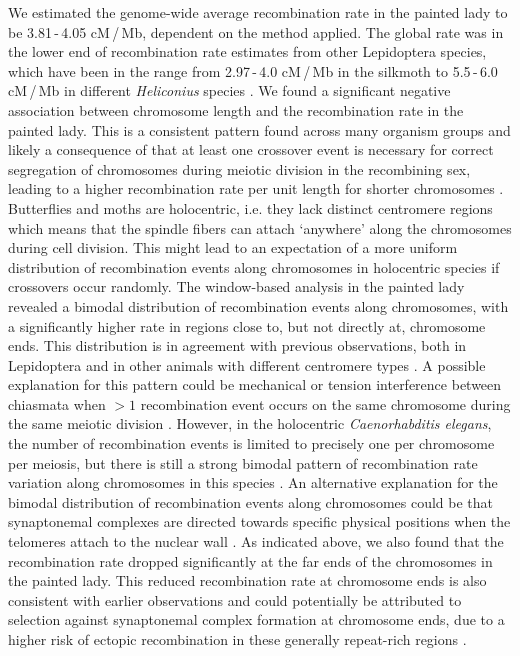 \documentclass[twocolumn]{bmcart}%
\begin{document}
We estimated the genome-wide average recombination rate in the painted lady to be 3.81\,-\,4.05 cM\,/\,Mb, dependent on the method applied. The global rate was in the lower end of recombination rate estimates from other Lepidoptera species, which have been in the range from 2.97\,-\,4.0 cM\,/\,Mb in the silkmoth \cite{yamamotoBACbasedIntegratedLinkage2008, yasukochiDenseGeneticMap1998} to 5.5\,-\,6.0 cM\,/\,Mb in different \textit{Heliconius} species \cite{jigginsGeneticLinkageMap2005, toblerFirstgenerationLinkageMap2005}. We found a significant negative association between chromosome length and the recombination rate in the painted lady. This is a consistent pattern found across many organism groups and likely a consequence of that at least one crossover event is necessary for correct segregation of chromosomes during meiotic division in the recombining sex, leading to a higher recombination rate per unit length for shorter chromosomes \cite{haenelMetaanalysisChromosomescaleCrossover2018, kawakamiWholegenomePatternsLinkage2017, martinRecombinationRateVariation2019}. Butterflies and moths are holocentric, i.e. they lack distinct centromere regions which means that the spindle fibers can attach ‘anywhere’ along the chromosomes during cell division. This might lead to an expectation of a more uniform distribution of recombination events along chromosomes in holocentric species if crossovers occur randomly. The window-based analysis in the painted lady revealed a bimodal distribution of  recombination events along chromosomes, with a significantly higher rate in regions close to, but not directly at, chromosome ends. This distribution is in agreement with previous observations, both in Lepidoptera and in other animals with different centromere types \cite{haenelMetaanalysisChromosomescaleCrossover2018, martinRecombinationRateVariation2019}. A possible explanation for this pattern could be mechanical or tension interference between chiasmata when $>1$ recombination event occurs on the same chromosome during the same meiotic division \cite{haenelMetaanalysisChromosomescaleCrossover2018}. However, in the holocentric \textit{Caenorhabditis elegans}, the number of recombination events is limited to precisely one per chromosome per meiosis, but there is still a strong bimodal pattern of recombination rate variation along chromosomes in this species \cite{barnesMeioticRecombinationNoncoding1995}. An alternative explanation for the bimodal distribution of recombination events along chromosomes could be that synaptonemal complexes are directed towards specific physical positions when the telomeres attach to the nuclear wall \cite{scherthanCentromereTelomereMovements1996}. As indicated above, we also found that the recombination rate dropped significantly at the far ends of the chromosomes in the painted lady. This reduced recombination rate at chromosome ends is also consistent with earlier observations and could potentially be attributed to selection against synaptonemal complex formation at chromosome ends, due to a higher risk of ectopic recombination in these generally repeat-rich regions \cite{smithNewSolutionsOld2020}.
\end{document}
